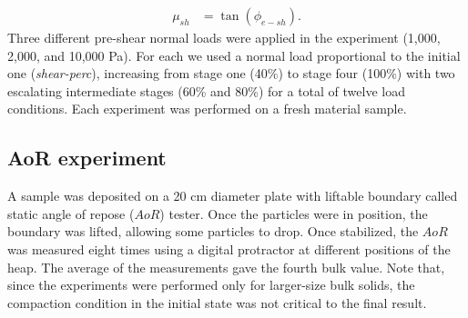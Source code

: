 \documentclass[review]{elsarticle}
\begin{document}
\begin{appendix}
\begin{equation}
\begin{aligned}
\mu_{sh} &= \tan(\phi_{e-sh}) .
\end{aligned}
 \label{eq:phi_s}
\end{equation}
Three different pre-shear normal loads were applied in the experiment
(1,000, 2,000, and 10,000 Pa).
For each we used a normal load proportional to the initial one
(\textit{shear-perc}), increasing from stage one (40\%) to stage four (100\%)
with two escalating intermediate stages (60\% and 80\%) for a total of twelve load conditions.
Each experiment was performed on a fresh material sample. \\

\subsection{AoR experiment}
\label{subsec:aorexperiment}
A sample was deposited on a 20 cm diameter plate with liftable boundary called
static angle of repose ($AoR$) tester.
Once the particles were in position, the boundary was lifted, allowing some particles to drop. 
Once stabilized, the $AoR$ was measured eight times using a digital protractor at different positions of the heap. 
The average of the measurements gave the fourth bulk value.
Note that, since the experiments were performed only for larger-size bulk
solids, the compaction condition in the initial state was not critical to the final result.

\end{appendix}

\renewcommand\thefigure{\arabic{figure}}
\end{document}
